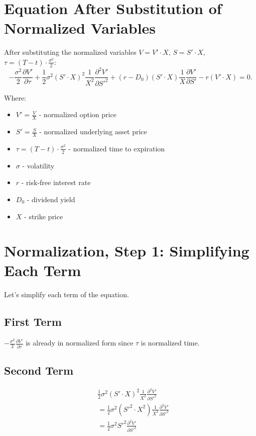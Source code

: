 \documentclass{article}
\begin{document}
\section*{Equation After Substitution of Normalized Variables}
After substituting the normalized variables $V = V' \cdot X$, $S = S' \cdot X$, $\tau = (T - t) \cdot \frac{\sigma^2}{2}$:
\begin{equation}
-\frac{\sigma^2}{2} \frac{\partial V'}{\partial \tau} + \frac{1}{2} \sigma^2 (S' \cdot X)^2 \frac{1}{X^2} \frac{\partial^2 V'}{\partial S'^2} + (r - D_0) (S' \cdot X) \frac{1}{X} \frac{\partial V'}{\partial S'} - r (V' \cdot X) = 0.
\end{equation}

Where:
\begin{itemize}
\item $V' = \frac{V}{X}$ - normalized option price
\item $S' = \frac{S}{X}$ - normalized underlying asset price
\item $\tau = (T - t) \cdot \frac{\sigma^2}{2}$ - normalized time to expiration
\item $\sigma$ - volatility
\item $r$ - risk-free interest rate
\item $D_0$ - dividend yield
\item $X$ - strike price
\end{itemize}

\section*{Normalization, Step 1: Simplifying Each Term}
Let's simplify each term of the equation.

\subsection*{First Term}
$-\frac{\sigma^2}{2} \frac{\partial V'}{\partial \tau}$ is already in normalized form since $\tau$ is normalized time.

\subsection*{Second Term}
\begin{align*}
&\frac{1}{2} \sigma^2 (S' \cdot X)^2 \frac{1}{X^2} \frac{\partial^2 V'}{\partial S'^2} \\
&= \frac{1}{2} \sigma^2 (S'^2 \cdot X^2) \frac{1}{X^2} \frac{\partial^2 V'}{\partial S'^2} \\
&= \frac{1}{2} \sigma^2 S'^2 \frac{\partial^2 V'}{\partial S'^2}
\end{align*}
\end{document}

